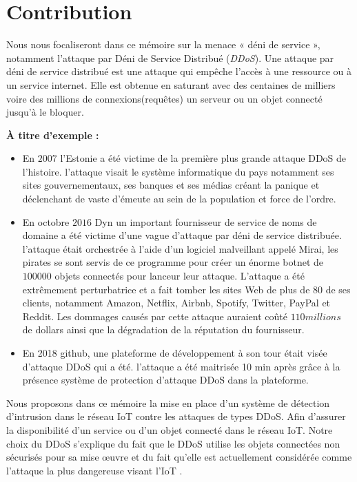 \section*{Contribution}
{\red
Nous nous focaliseront dans ce mémoire sur la menace « déni de service », notamment l'attaque par Déni de Service Distribué (\emph{DDoS}). Une attaque par déni de service distribué est une attaque qui empêche l'accès à une ressource ou à un service internet. Elle est obtenue en saturant avec des centaines de milliers voire des millions de connexions(requêtes) un serveur ou un objet connecté jusqu'à le bloquer.

\textbf{À titre d'exemple : } 
\begin{itemize}
	\item En $2007$ l'Estonie \citep{refestonie} a été victime de la première plus grande attaque DDoS de l'histoire. l'attaque visait le système informatique du pays notamment ses sites gouvernementaux, ses banques et ses médias créant la panique et déclenchant de vaste d'émeute au sein de la population et force de l'ordre. 
	\item En octobre $2016$ \citep{refddos} Dyn un important fournisseur de service de noms de domaine a été victime d'une vague d'attaque par déni de service distribuée. l'attaque était orchestrée à l'aide d'un logiciel malveillant appelé Mirai, les pirates se sont servis de ce programme pour créer un énorme botnet de $100000$ objets connectés pour lanceur leur attaque. L'attaque a été extrêmement perturbatrice et a fait tomber les sites Web de plus de $80$ de ses clients, notamment Amazon, Netflix, Airbnb, Spotify, Twitter, PayPal et Reddit. Les dommages causés par cette attaque auraient coûté $110 millions$ de dollars ainsi que la dégradation de la réputation du fournisseur.
	\item En 2018 github, une plateforme de développement à son tour était visée d'attaque DDoS qui a été. l'attaque a été maitrisée 10 min après \citep{refddos} grâce à la présence système de protection d'attaque DDoS dans la plateforme.  
\end{itemize}
}

Nous proposons dans ce mémoire la mise en place d'un système de détection d'intrusion dans le réseau IoT contre les attaques de types DDoS. Afin d'assurer la disponibilité d'un service ou d'un objet connecté dans le réseau IoT. Notre choix du DDoS s'explique du fait que le DDoS utilise les objets connectées non sécurisés pour sa mise œuvre et du fait qu'elle est actuellement considérée comme l'attaque la plus dangereuse visant l'IoT \citep{8355541} \cite{inproceedings}.

